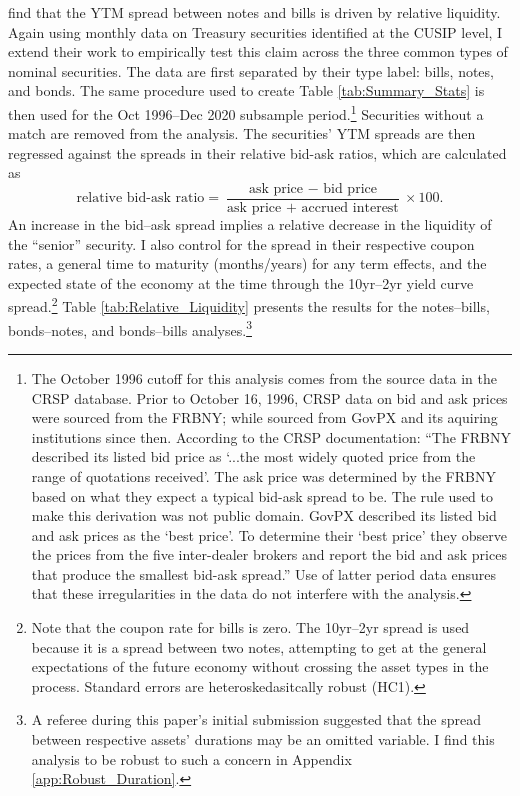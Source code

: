 \documentclass[11pt,a4paper,margin=1.5in]{article}
\begin{document}
\citet{Amihud-Mendelson:1991} find that the YTM spread between notes and bills is driven by relative liquidity.
Again using monthly data on Treasury securities identified at the CUSIP level, I extend their work to empirically test this claim across the three common types of nominal securities.
The data are first separated by their type label: bills, notes, and bonds.
The same procedure used to create Table \ref{tab:Summary_Stats} is then used for the Oct 1996--Dec 2020 subsample period.\footnote{
	The October 1996 cutoff for this analysis comes from the source data in the CRSP database. 
	Prior to October 16, 1996, CRSP data on bid and ask prices were sourced from the FRBNY; while sourced from GovPX and its aquiring institutions since then.
	According to the CRSP documentation: ``The FRBNY described its listed bid price as `...the most widely quoted price from the range of quotations received'. 
	The ask price was determined by the FRBNY based on what they expect a typical bid-ask spread to be. 
	The rule used to make this derivation was not public domain.
	GovPX described its listed bid and ask prices as the `best price'. To determine their `best price' they observe the prices from the five inter-dealer brokers and report the bid and ask prices that produce the smallest bid-ask spread.''
	Use of latter period data ensures that these irregularities in the data do not interfere with the analysis.
}
Securities without a match are removed from the analysis.
The securities' YTM spreads are then regressed against the spreads in their relative bid-ask ratios, which are calculated as 
$$ \text{relative bid-ask ratio} = \frac{\text{ask price }-\text{ bid price}}{\text{ask price }+\text{ accrued interest}}\times 100.$$
An increase in the bid--ask spread implies a relative decrease in the liquidity of the ``senior'' security.
I also control for the spread in their respective coupon rates, a general time to maturity (months/years) for any term effects, and the expected state of the economy at the time through the 10yr--2yr yield curve spread.\footnote{
	Note that the coupon rate for bills is zero.
	The 10yr--2yr spread is used because it is a spread between two notes, attempting to get at the general expectations of the future economy without crossing the asset types in the process. 
	Standard errors are heteroskedasitcally robust (HC1).
}
Table \ref{tab:Relative_Liquidity} presents the results for the notes--bills, bonds--notes, and bonds--bills analyses.\footnote{
	A referee during this paper's initial submission suggested that the spread between respective assets' durations may be an omitted variable.
	I find this analysis to be robust to such a concern in Appendix \ref{app:Robust_Duration}.
}
\end{document}
